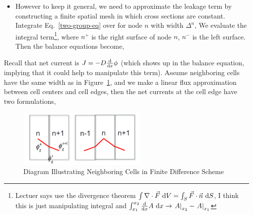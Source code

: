 \documentclass{school-22.211-notes}
\begin{document}
\begin{itemize}
\item However to keep it general, we need to approximate the leakage term by constructing a finite spatial mesh in which cross sections are constant. Integrate Eq.~\ref{two-group-eq} over for node $n$ with width $\Delta^n$,
We evaluate the integral term\footnote{Lectuer says use the divergence theorem $\int \nabla \cdot \vec{F} \mbox{ }\mathrm{d} V = \int_S \vec{F} \cdot \vec{n} \mbox{ }\mathrm{d} S$, I think this is just manipulating integral and $\int_{x_1}^{x_2} \frac{\mathrm{d}}{\mathrm{d}x} A \mbox{ }\mathrm{d} x \to \left. A \right|_{x_2} - \left. A \right|_{x_1}$}, 
where $n^+$ is the right surface of node $n$, $n^-$ is the left surface. Then the balance equations become,

\end{itemize}



Recall that net current is $J = -D \frac{\mathrm{d}}{\mathrm{d}x} \phi$ (which shows up in the balance equation, implying that it could help to manipulate this term). Assume neighboring cells have the same width as in Figure~\ref{diagram-finite-difference}, and we make a linear flux approximation between cell centers and cell edges, then the net currents at the cell edge have two formulations, 
\begin{figure}[ht]
  \centering
  \includegraphics[width=2.5in]{images/dfs/diagram-finite-difference.png}
  \caption{Diagram Illustrating Neighboring Cells in Finite Difference Scheme} \label{diagram-finite-difference}
\end{figure}
\end{document}
